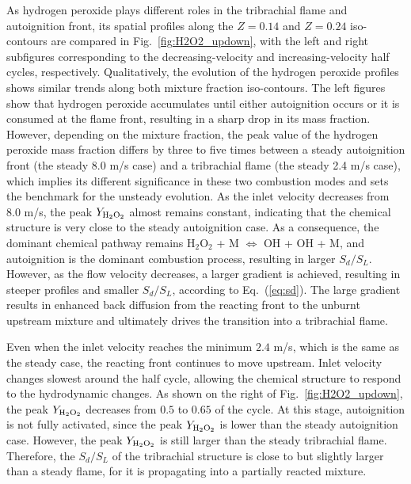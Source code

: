 \documentclass[review,3p,times]{elsarticle}
\begin{document}
\textcolor{Rev1}{As hydrogen peroxide plays different roles in the tribrachial flame and autoignition front, its spatial profiles along the $Z = 0.14$ and $Z = 0.24$ iso-contours are compared in Fig.~\ref{fig:H2O2_updown}, with the left and right subfigures corresponding to the decreasing-velocity and increasing-velocity half cycles, respectively.  Qualitatively, the evolution of the hydrogen peroxide profiles shows similar trends along both mixture fraction iso-contours.  The left figures show that hydrogen peroxide accumulates until either autoignition occurs or it is consumed at the flame front, resulting in a sharp drop in its mass fraction.  However, depending on the mixture fraction, the peak value of the hydrogen peroxide mass fraction differs by three to five times between a steady autoignition front (the steady 8.0 m/s case) and a tribrachial flame (the steady 2.4 m/s case), which implies its different significance in these two combustion modes and sets the benchmark for the unsteady evolution.}  As the inlet velocity decreases from $8.0$ m/s, the peak $Y_{\rm H{_2}O{_2}}$ almost remains constant, indicating that the chemical structure is very close to the steady autoignition case.  As a consequence, the dominant chemical pathway remains H$_2$O$_2$ + M $\Longleftrightarrow$ OH + OH + M, and autoignition is the dominant combustion process, resulting in larger $S_d/S_L$.  However, as the flow velocity decreases, a larger gradient is achieved, resulting in steeper profiles and smaller $S_d/S_L$, according to Eq.~(\ref{eq:sd}).  \textcolor{Rev1}{The large gradient results in enhanced back diffusion from the reacting front to the unburnt upstream mixture and ultimately drives the transition into a tribrachial flame.}       

Even when the inlet velocity reaches the minimum $2.4$ m/s, which is the same as the steady case, the reacting front continues to move upstream.  Inlet velocity changes slowest around the half cycle, allowing the chemical structure to respond to the hydrodynamic changes.  As shown on the right of Fig.~\ref{fig:H2O2_updown}, the peak $Y_{\rm H{_2}O{_2}}$ decreases from $0.5$ to $0.65$ of the cycle.  At this stage, autoignition is not fully activated, since the peak $Y_{\rm H{_2}O{_2}}$ is lower than the steady autoignition case.  However, the peak $Y_{\rm H{_2}O{_2}}$ is still larger than the steady tribrachial flame.  Therefore, the $S_d/S_L$ of the tribrachial structure is close to but slightly larger than a steady flame, for it is propagating into a partially reacted mixture.  
\end{document}
